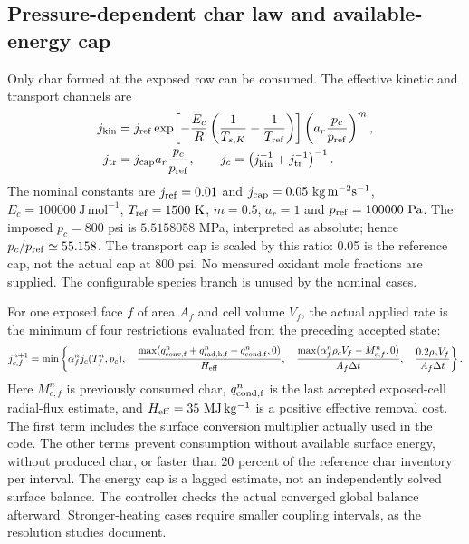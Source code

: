 \documentclass[oneside,openany]{amsdtx}
\begin{document}
\subsection{Pressure-dependent char law and available-energy cap}
Only char formed at the exposed row can be consumed. The effective kinetic and transport channels are
\begin{align}
 j_{\rm kin}&=j_{\rm ref}\exp\!\left[-\frac{E_c}{R}\left(\frac1{T_{s,K}}-\frac1{T_{\rm ref}}\right)\right]
 \left(a_r\frac{p_c}{p_{\rm ref}}\right)^m,\\
 j_{\rm tr}&=j_{\rm cap}a_r\frac{p_c}{p_{\rm ref}},\qquad
 j_c=\left(j_{\rm kin}^{-1}+j_{\rm tr}^{-1}\right)^{-1}.
\end{align}
The nominal constants are $j_{\rm ref}=0.01$ and $j_{\rm cap}=0.05\ \mathrm{kg\,m^{-2}s^{-1}}$, $E_c=100000\ \mathrm{J\,mol^{-1}}$, $T_{\rm ref}=1500\ \mathrm K$, $m=0.5$, $a_r=1$ and $p_{\rm ref}=100000\ \mathrm{Pa}$. The imposed $p_c=800$ psi is $5.5158058$ MPa, interpreted as absolute; hence $p_c/p_{\rm ref}\simeq55.158$. The transport cap is scaled by this ratio: 0.05 is the reference cap, not the actual cap at 800 psi. No measured oxidant mole fractions are supplied. The configurable species branch is unused by the nominal cases.

For one exposed face $f$ of area $A_f$ and cell volume $V_f$, the actual applied rate is the minimum of four restrictions evaluated from the preceding accepted state:
\begin{equation}\label{eq:char-cap}
 j_{c,f}^{n+1}=\min\left\{\alpha_f^n j_c(T_f^n,p_c),\quad
 \frac{\max(q_{\rm conv,f}^{n}+q_{\rm rad,h,f}^{n}-q_{\rm cond,f}^{n},0)}{H_{\rm eff}},\quad
 \frac{\max(\alpha_f^n\rho_cV_f-M_{c,f}^n,0)}{A_f\Delta t},\quad
 \frac{0.2\rho_cV_f}{A_f\Delta t}\right\}.
\end{equation}
Here $M_{c,f}^n$ is previously consumed char, $q_{\rm cond,f}^{n}$ is the last accepted exposed-cell radial-flux estimate, and $H_{\rm eff}=35\ \mathrm{MJ\,kg^{-1}}$ is a positive effective removal cost. The first term includes the surface conversion multiplier actually used in the code. The other terms prevent consumption without available surface energy, without produced char, or faster than 20 percent of the reference char inventory per interval. The energy cap is a lagged estimate, not an independently solved surface balance. The controller checks the actual converged global balance afterward. Stronger-heating cases require smaller coupling intervals, as the resolution studies document.
\end{document}
